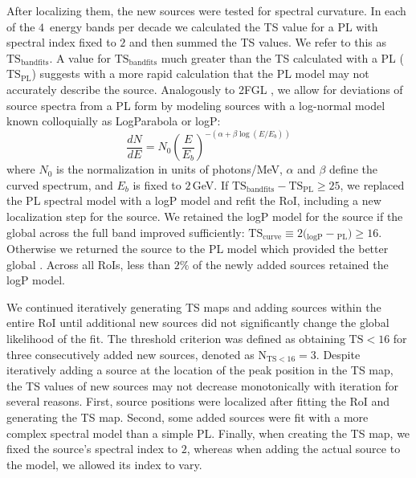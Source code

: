 After localizing them, the new sources were tested for spectral curvature. In each of the $4$~energy bands per decade we calculated the TS value for a PL with spectral index fixed to $2$ and then summed the TS values. 
We refer to this as $\mathrm{TS_{band fits}}$. A value for $\mathrm{TS_{band fits}}$ much greater than the TS calculated with a PL ($\mathrm{TS_{PL}}$) suggests with a more rapid calculation that the PL model may not accurately describe the source. %
Analogously to 2FGL \citep{Nolan12-2FGL}, we allow for deviations of source spectra from a PL form by modeling sources with a log-normal model known colloquially as LogParabola or logP:
\begin{equation}
	\newcommand{\pfrac}[2]{\left(\frac{#1}{#2}\right)} \frac{dN}{dE} = N_0\pfrac{E}{E_b}^{-(\alpha + \beta\log(E/E_b))}
	\label{eqn:logP}
\end{equation}
where $N_0$ is the normalization in units of photons/MeV, $\alpha$ and $\beta$ define the curved spectrum, and $E_b$ is fixed to $2$\,GeV. If $\mathrm{TS_{band fits} - TS_{PL}} \geq 25$, we replaced the PL spectral model with a logP model and refit the RoI, including a new localization step for the source. We retained the logP model for the source if the global \logL{} across the full band improved sufficiently: 
$\mathrm{TS_{curve}} \equiv 2 ($\logL{}$_{\mathrm{logP}}-$\logL{}$_{\mathrm{PL}}) \geq 16$. 
Otherwise we returned the source to the PL model which provided the better global \logL. Across all RoIs, less than $2\%$ of the newly added sources retained the logP model. 

We continued iteratively generating TS maps and adding sources within the entire RoI until additional new sources did not significantly change the global likelihood of the fit. The threshold criterion was defined as obtaining $\mathrm{TS < 16}$ for three consecutively added new sources, denoted as $\mathrm{N_{TS < 16} = 3}$. Despite iteratively adding a source at the location of the peak position in the TS map, the TS values of new sources may not decrease monotonically with iteration for several reasons. First, source positions were localized after fitting the RoI and generating the TS map. Second, some added sources were fit with a more complex spectral model than a simple PL. Finally, when creating the TS map, we fixed the source's spectral index to $2$, whereas when adding the actual source to the model, we allowed its index to vary. 

